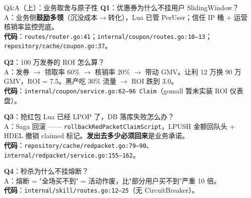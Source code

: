 \documentclass[aspectratio=169,11pt]{beamer}
\begin{document}
\begin{frame}[shrink]{Q\&A（上）：业务取舍与原子性}
\textbf{Q1}：优惠券为什么不挂用户 SlidingWindow？\\
\hspace{4mm}\small A：业务侧\textbf{鼓励多领}（沉没成本$\to$转化），Lua 已管 PerUser；信任 IP 桶 + 运营核销率监控兜底。\\
\hspace{4mm}\small \textbf{代码}：\texttt{routes/router.go:41}；\texttt{internal/coupon/routes.go:10--13}；\texttt{repository/cache/coupon.go:37}。

\vspace{2mm}
\textbf{Q2}：100 万发券的 ROI 怎么算？\\
\hspace{4mm}\small A：发券 $\to$ 领取率 60\% $\to$ 核销率 20\% $\to$ 带动 GMV。让利 12 万换 90 万 GMV，ROI = 7.5。黑产吃 30\% 流量 $\to$ ROI 跌到 3.0。\\
\hspace{4mm}\small \textbf{代码}：\texttt{internal/coupon/service.go:62--96 Claim}（gomall 暂未实装 ROI 仪表盘）。

\vspace{2mm}
\textbf{Q3}：抢红包 Lua 已经 LPOP 了，DB 落库失败怎么办？\\
\hspace{4mm}\small A：Saga 回滚 —— \texttt{rollbackRedPacketClaimScript}，LPUSH 金额回队头 + HDEL 撤销 claimed 标记。\textbf{发出去多少必须回来}是业务承诺。\\
\hspace{4mm}\small \textbf{代码}：\texttt{repository/cache/redpacket.go:79--90}、\texttt{internal/redpacket/service.go:155--162}。

\vspace{2mm}
\textbf{Q4}：秒杀为什么不挂熔断？\\
\hspace{4mm}\small A：熔断 = "全场买不到" = 活动作废，比"部分用户买不到"严重 10 倍。\\
\hspace{4mm}\small \textbf{代码}：\texttt{internal/skill/routes.go:12--25}（无 CircuitBreaker）。
\end{frame}
\end{document}
